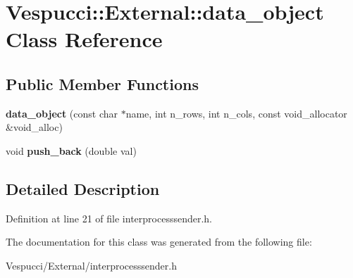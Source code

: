 \hypertarget{class_vespucci_1_1_external_1_1data__object}{}\section{Vespucci\+:\+:External\+:\+:data\+\_\+object Class Reference}
\label{class_vespucci_1_1_external_1_1data__object}
\subsection*{Public Member Functions}
\begin{DoxyCompactItemize}
\item 
{\bfseries data\+\_\+object} (const char $\ast$name, int n\+\_\+rows, int n\+\_\+cols, const void\+\_\+allocator \&void\+\_\+alloc)\hypertarget{class_vespucci_1_1_external_1_1data__object_a028e2ac605bdccad7171e3ca3a8b61f1}{}\label{class_vespucci_1_1_external_1_1data__object_a028e2ac605bdccad7171e3ca3a8b61f1}

\item 
void {\bfseries push\+\_\+back} (double val)\hypertarget{class_vespucci_1_1_external_1_1data__object_ae1d797ae9b976c0fa54221b308629851}{}\label{class_vespucci_1_1_external_1_1data__object_ae1d797ae9b976c0fa54221b308629851}

\end{DoxyCompactItemize}


\subsection{Detailed Description}


Definition at line 21 of file interprocesssender.\+h.



The documentation for this class was generated from the following file\+:\begin{DoxyCompactItemize}
\item 
Vespucci/\+External/interprocesssender.\+h\end{DoxyCompactItemize}
